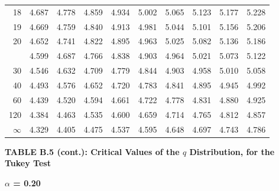\documentclass[10pt]{article}
\begin{document}
\begin{longtable}{@{}r!{\vrule width 0.8pt\hspace{0.55em}}rrrrrrrrr@{}}
18 & 4.687 & 4.778 & 4.859 & 4.934 & 5.002 & 5.065 & 5.123 & 5.177 & 5.228 \\
19 & 4.669 & 4.759 & 4.840 & 4.913 & 4.981 & 5.044 & 5.101 & 5.156 & 5.206 \\
20 & 4.652 & 4.741 & 4.822 & 4.895 & 4.963 & 5.025 & 5.082 & 5.136 & 5.186 \\
 & 4.599 & 4.687 & 4.766 & 4.838 & 4.903 & 4.964 & 5.021 & 5.073 & 5.122 \\
30 & 4.546 & 4.632 & 4.709 & 4.779 & 4.844 & 4.903 & 4.958 & 5.010 & 5.058 \\
40 & 4.493 & 4.576 & 4.652 & 4.720 & 4.783 & 4.841 & 4.895 & 4.945 & 4.992 \\
60 & 4.439 & 4.520 & 4.594 & 4.661 & 4.722 & 4.778 & 4.831 & 4.880 & 4.925 \\
120 & 4.384 & 4.463 & 4.535 & 4.600 & 4.659 & 4.714 & 4.765 & 4.812 & 4.857 \\
\addlinespace[0.30em]
$\infty$ & 4.329 & 4.405 & 4.475 & 4.537 & 4.595 & 4.648 & 4.697 & 4.743 & 4.786 \\
\end{longtable}
\newpage
\thispagestyle{empty}
\begin{center}
{\large\bfseries TABLE B.5 (cont.): Critical Values of the $q$ Distribution, for the Tukey Test\par}
\end{center}
{\large\bfseries $\alpha$ = 0.20\par}
\vspace{0.45em}
\small
\end{document}
